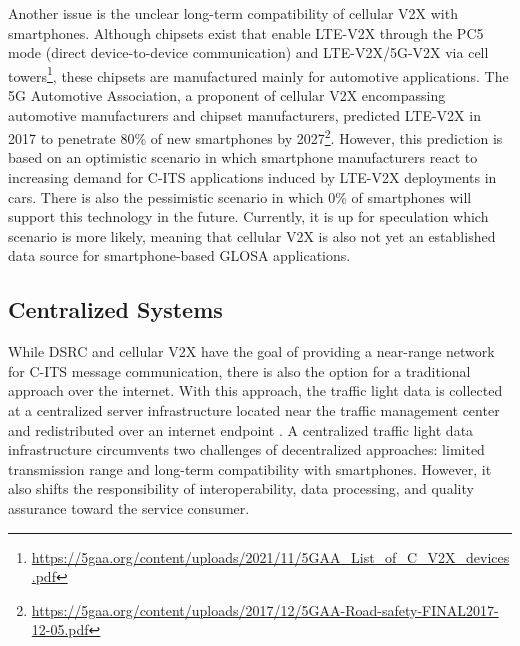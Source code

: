 Another issue is the unclear long-term compatibility of cellular V2X with smartphones. Although chipsets exist that enable LTE-V2X through the PC5 mode (direct device-to-device communication) and LTE-V2X/5G-V2X via cell towers\footnote{\url{https://5gaa.org/content/uploads/2021/11/5GAA_List_of_C_V2X_devices.pdf}}, these chipsets are manufactured mainly for automotive applications. The 5G Automotive Association, a proponent of cellular V2X encompassing automotive manufacturers and chipset manufacturers, predicted LTE-V2X in 2017 to penetrate 80\% of new smartphones by 2027\footnote{\url{https://5gaa.org/content/uploads/2017/12/5GAA-Road-safety-FINAL2017-12-05.pdf}}. However, this prediction is based on an optimistic scenario in which smartphone manufacturers react to increasing demand for C-ITS applications induced by LTE-V2X deployments in cars. There is also the pessimistic scenario in which 0\% of smartphones will support this technology in the future. Currently, it is up for speculation which scenario is more likely, meaning that cellular V2X is also not yet an established data source for smartphone-based GLOSA applications.

\subsection{Centralized Systems}

While DSRC and cellular V2X have the goal of providing a near-range network for C-ITS message communication, there is also the option for a traditional approach over the internet. With this approach, the traffic light data is collected at a centralized server infrastructure located near the traffic management center and redistributed over an internet endpoint \cite{zweck_traffic_2013, protschky_extensive_2014, protschky_adaptive_2014}. A centralized traffic light data infrastructure circumvents two challenges of decentralized approaches: limited transmission range and long-term compatibility with smartphones. However, it also shifts the responsibility of interoperability, data processing, and quality assurance toward the service consumer.

